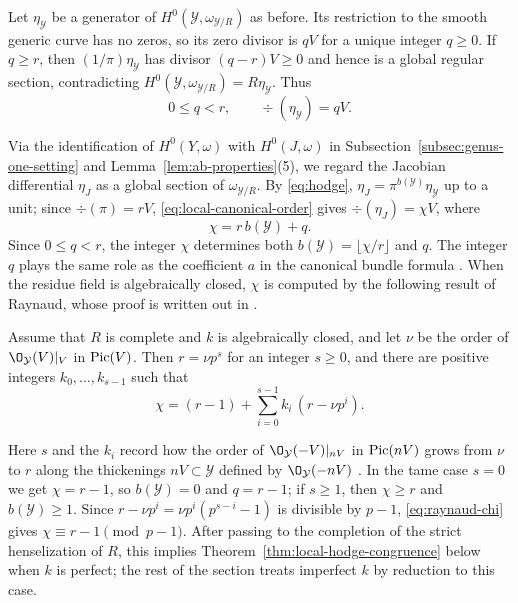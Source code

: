 Let $\eta_{\mathcal Y}$ be a generator of $H^0(\mathcal Y,\omega_{\mathcal Y/R})$ as before.
Its restriction to the smooth generic curve has no zeros, so its zero divisor is $qV$ for a unique integer $q\geq0$.
If $q\geq r$, then $(1/\pi)\eta_{\mathcal Y}$ has divisor $(q-r)V\geq0$ and hence is a global regular section, contradicting $H^0(\mathcal Y,\omega_{\mathcal Y/R})=R\eta_{\mathcal Y}$.
Thus
\begin{equation}\label{eq:local-canonical-order}
  0\leq q<r,
  \qquad \div(\eta_{\mathcal Y})=qV.
\end{equation}

Via the identification of $H^0(Y,\omega)$ with $H^0(J,\omega)$ in Subsection~\ref{subsec:genus-one-setting} and Lemma~\ref{lem:ab-properties}(5), we regard the Jacobian differential $\eta_J$ as a global section of $\omega_{\mathcal Y/R}$.
By \eqref{eq:hodge}, $\eta_J = \pi^{b(\mathcal Y)}\eta_{\mathcal Y}$ up to a unit; since $\div(\pi) = rV$, \eqref{eq:local-canonical-order} gives $\div(\eta_J) = \chi V$, where
\[
  \chi = r\,b(\mathcal Y)+q.
\]
Since $0\leq q<r$, the integer $\chi$ determines both $b(\mathcal Y) = \lfloor\chi/r\rfloor$ and $q$.
The integer $q$ plays the same role as the coefficient $a$ in the canonical bundle formula \cite[Theorem~2]{BM77}.
When the residue field is algebraically closed, $\chi$ is computed by the following result of Raynaud, whose proof is written out in \cite{BT14}.

\begin{proposition}[{\cite[Proposition~3.17]{BT14}}]\label{prop:raynaud-chi}
Assume that $R$ is complete and $k$ is algebraically closed, and let $\nu$ be the order of $\O_{\mathcal Y}(V)|_V$ in $\operatorname{Pic}(V)$.
Then $r = \nu p^s$ for an integer $s\geq0$, and there are positive integers $k_0,\dots,k_{s-1}$ such that
\begin{equation}\label{eq:raynaud-chi}
  \chi = (r-1)+\sum_{i=0}^{s-1}k_i\,(r-\nu p^i).
\end{equation}
\end{proposition}

Here $s$ and the $k_i$ record how the order of $\O_{\mathcal Y}(-V)|_{nV}$ in $\operatorname{Pic}(nV)$ grows from $\nu$ to $r$ along the thickenings $nV\subset\mathcal Y$ defined by $\O_{\mathcal Y}(-nV)$ \cite[Lemma~3.12]{BT14}.
In the tame case $s = 0$ we get $\chi = r-1$, so $b(\mathcal Y) = 0$ and $q = r-1$; if $s\geq1$, then $\chi\geq r$ and $b(\mathcal Y)\geq1$.
Since $r-\nu p^i = \nu p^i(p^{s-i}-1)$ is divisible by $p-1$, \eqref{eq:raynaud-chi} gives $\chi\equiv r-1\pmod{p-1}$.
After passing to the completion of the strict henselization of $R$, this implies Theorem~\ref{thm:local-hodge-congruence} below when $k$ is perfect; the rest of the section treats imperfect $k$ by reduction to this case.

